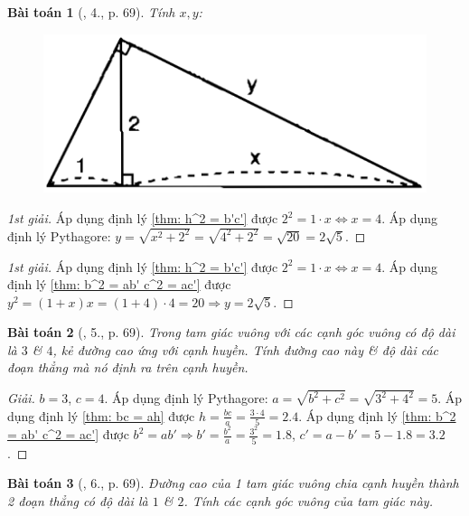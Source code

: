 \documentclass{article}
\newtheorem{baitoan}{Bài toán}
\begin{document}
\begin{baitoan}[\cite{SGK_Toan_9_tap_1}, 4., p. 69]
	Tính $x,y$:
	\begin{figure}[H]
		\centering
		\includegraphics[scale=.25]{SGK_Toan_9_7_p69}
	\end{figure}
\end{baitoan}

\begin{proof}[1st giải]
	Áp dụng định lý \ref{thm: h^2 = b'c'} được $2^2 = 1\cdot x\Leftrightarrow x = 4$. Áp dụng định lý Pythagore: $y = \sqrt{x^2 + 2^2} = \sqrt{4^2 + 2^2} = \sqrt{20} = 2\sqrt{5}$.
\end{proof}

\begin{proof}[1st giải]
	Áp dụng định lý \ref{thm: h^2 = b'c'} được $2^2 = 1\cdot x\Leftrightarrow x = 4$. Áp dụng định lý \ref{thm: b^2 = ab' c^2 = ac'} được $y^2 = (1 + x)x = (1 + 4)\cdot4 = 20\Rightarrow y = 2\sqrt{5}$.
\end{proof}

\begin{baitoan}[\cite{SGK_Toan_9_tap_1}, 5., p. 69]
	Trong tam giác vuông với các cạnh góc vuông có độ dài là $3$ \& $4$, kẻ đường cao ứng với cạnh huyền. Tính đường cao này \& độ dài các đoạn thẳng mà nó định ra trên cạnh huyền.
\end{baitoan}

\begin{proof}[Giải]
	$b = 3$, $c = 4$. Áp dụng định lý Pythagore: $a = \sqrt{b^2 + c^2} = \sqrt{3^2 + 4^2} = 5$. Áp dụng định lý \ref{thm: bc = ah} được $h = \frac{bc}{a} = \frac{3\cdot4}{5} = 2.4$. Áp dụng định lý \ref{thm: b^2 = ab' c^2 = ac'} được $b^2 = ab'\Rightarrow b' = \frac{b^2}{a} = \frac{3^2}{5} = 1.8$, $c' = a - b' = 5 - 1.8 = 3.2$.
\end{proof}

\begin{baitoan}[\cite{SGK_Toan_9_tap_1}, 6., p. 69]
	Đường cao của 1 tam giác vuông chia cạnh huyền thành 2 đoạn thẳng có độ dài là $1$ \& $2$. Tính các cạnh góc vuông của tam giác này.
\end{baitoan}
\end{document}
